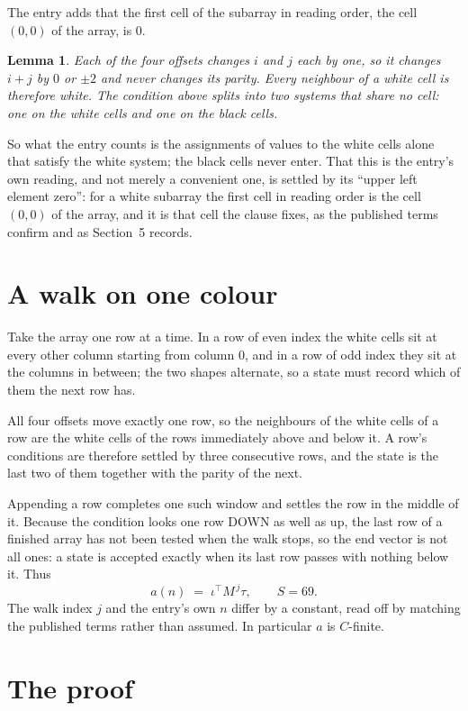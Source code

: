 \documentclass[11pt,a4paper]{article}
\theoremstyle{plain}
\newtheorem{lemma}[theorem]{Lemma}
\theoremstyle{definition}
\begin{document}
The entry adds that the first cell of the subarray in reading order, the cell $(0,0)$ of the array, is $0$.

\begin{lemma}\label{lem:split}
Each of the four offsets changes $i$ and $j$ each by one, so it changes $i+j$ by $0$ or $\pm2$
and never changes its parity. Every neighbour of a white cell is therefore white. The condition
above splits into two systems that share no cell: one on the white cells and one on the black
cells.
\end{lemma}

So what the entry counts is the assignments of values to the white cells alone that satisfy the
white system; the black cells never enter. That this is the entry's own reading, and not
merely a convenient one, is settled by its ``upper left element zero'': for a white subarray the
first cell in reading order is the cell $(0,0)$ of the array, and it is that cell the
clause fixes, as the published terms confirm and as Section~5 records.

\section{A walk on one colour}

Take the array one row at a time. In a row of even index the white cells sit at every other
column starting from column $0$, and in a row of odd index they sit at the columns in
between; the two shapes alternate, so a state must record which of them the next row has.

All four offsets move exactly one row, so the neighbours of the white cells of a row are the
white cells of the rows immediately above and below it. A row's conditions are therefore settled
by three consecutive rows, and the state is the last two of them together with the parity of the
next.

Appending a row completes one such window and settles the row in the middle of it. Because the
condition looks one row DOWN as well as up, the last row of a finished array has not been tested
when the walk stops, so the end vector is not all ones: a state is accepted exactly when its
last row passes with nothing below it. Thus
\[
a(n)\;=\;\iota^{\!\top}M^{\,j}\tau ,\qquad S=69.
\]
The walk index $j$ and the entry's own $n$ differ by a constant, read off by matching the
published terms rather than assumed. In particular $a$ is $C$-finite.

\section{The proof}
\end{document}
